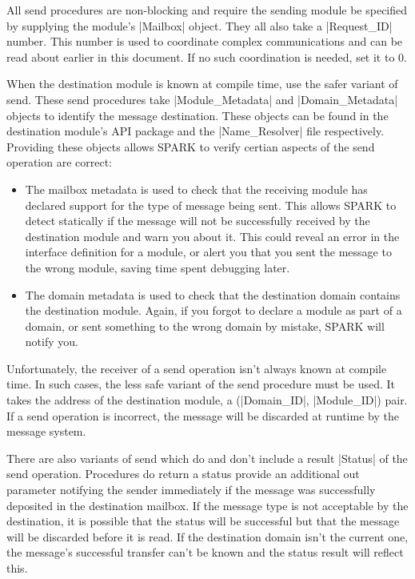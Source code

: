 All send procedures are non-blocking and require the sending module be specified by supplying the module's |Mailbox| object. They all also take a |Request_ID| number. This number is used to coordinate complex communications and can be read about earlier in this document. If no such coordination is needed, set it to 0.

When the destination module is known at compile time, use the safer variant of send. These send procedures take |Module_Metadata| and |Domain_Metadata| objects to identify the message destination. These objects can be found in the destination module's API package and the |Name_Resolver| file respectively. Providing these objects allows SPARK to verify certian aspects of the send operation are correct:

\begin{itemize}
\item The mailbox metadata is used to check that the receiving module has declared support for the type of message being sent. This allows SPARK to detect statically if the message will not be successfully received by the destination module and warn you about it. This could reveal an error in the interface definition for a module, or alert you that you sent the message to the wrong module, saving time spent debugging later.

\item The domain metadata is used to check that the destination domain contains the destination module. Again, if you forgot to declare a module as part of a domain, or sent something to the wrong domain by mistake, SPARK will notify you.
\end{itemize}

Unfortunately, the receiver of a send operation isn't always known at compile time. In such cases, the less safe variant of the send procedure must be used. It takes the address of the destination module, a (|Domain_ID|, |Module_ID|) pair. If a send operation is incorrect, the message will be discarded at runtime by the message system.

There are also variants of send which do and don't include a result |Status| of the send operation. Procedures do return a status provide an additional out parameter notifying the sender immediately if the message was successfully deposited in the destination mailbox. If the message type is not acceptable by the destination, it is possible that the status will be successful but that the message will be discarded before it is read. If the destination domain isn't the current one, the message's successful transfer can't be known and the status result will reflect this.


